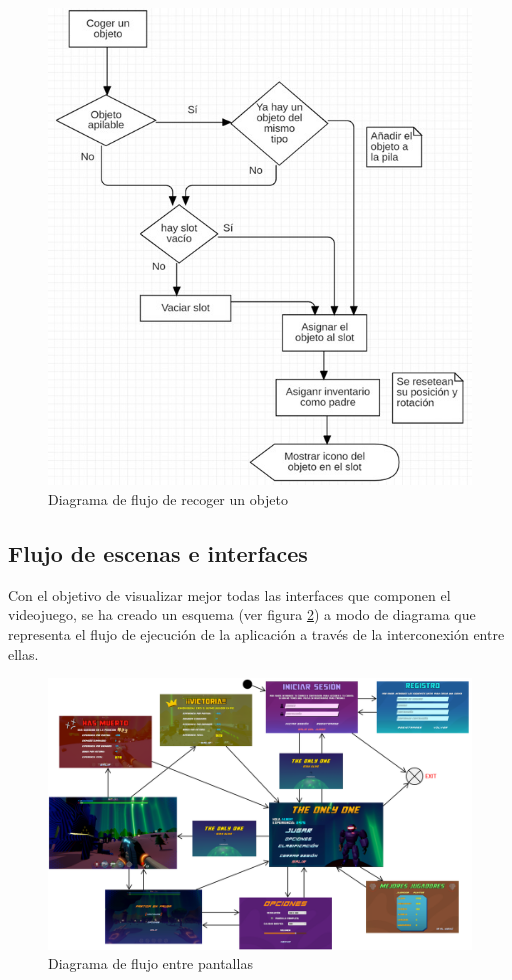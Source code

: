 \begin{figure}[h]
    \centering
    \includegraphics[scale=0.5]{img/PickingObjectFlowchart.jpg}
    \caption{Diagrama de flujo de recoger un objeto}
    \label{fig:DiagramaRecogerObjeto}
    \end{figure}

\subsection{Flujo de escenas e interfaces}
Con el objetivo de visualizar mejor todas las interfaces que componen el videojuego, se ha creado un esquema (ver figura \ref{fig:DiagramaPantallas}) a modo de diagrama que representa el flujo de ejecución de la aplicación a través de la interconexión entre ellas.

\begin{figure}[h]
    \centering
    \includegraphics[scale=0.4]{img/ScreenFlowChart.png}
    \caption{Diagrama de flujo entre pantallas}
    \label{fig:DiagramaPantallas}
    \end{figure}
    
